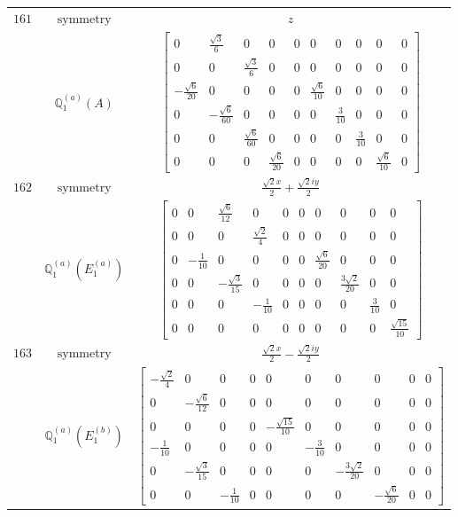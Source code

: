 \documentclass[fleqn,8pt,landscape]{jsarticle}
\begin{document}
\begin{longtable}{ccc}
$ 161 $ & $ \text{symmetry} $ & $ z $ \\
$  $ & $ \mathbb{Q}_{1}^{(a)}(A) $ & $ \begin{bmatrix} 0 & \frac{\sqrt{3}}{6} & 0 & 0 & 0 & 0 & 0 & 0 & 0 & 0 \\ 0 & 0 & \frac{\sqrt{3}}{6} & 0 & 0 & 0 & 0 & 0 & 0 & 0 \\ - \frac{\sqrt{6}}{20} & 0 & 0 & 0 & 0 & \frac{\sqrt{6}}{10} & 0 & 0 & 0 & 0 \\ 0 & - \frac{\sqrt{6}}{60} & 0 & 0 & 0 & 0 & \frac{3}{10} & 0 & 0 & 0 \\ 0 & 0 & \frac{\sqrt{6}}{60} & 0 & 0 & 0 & 0 & \frac{3}{10} & 0 & 0 \\ 0 & 0 & 0 & \frac{\sqrt{6}}{20} & 0 & 0 & 0 & 0 & \frac{\sqrt{6}}{10} & 0 \end{bmatrix} $ \\ \hline
$ 162 $ & $ \text{symmetry} $ & $ \frac{\sqrt{2} x}{2} + \frac{\sqrt{2} i y}{2} $ \\
$  $ & $ \mathbb{Q}_{1}^{(a)}(E_{1}^{(a)}) $ & $ \begin{bmatrix} 0 & 0 & \frac{\sqrt{6}}{12} & 0 & 0 & 0 & 0 & 0 & 0 & 0 \\ 0 & 0 & 0 & \frac{\sqrt{2}}{4} & 0 & 0 & 0 & 0 & 0 & 0 \\ 0 & - \frac{1}{10} & 0 & 0 & 0 & 0 & \frac{\sqrt{6}}{20} & 0 & 0 & 0 \\ 0 & 0 & - \frac{\sqrt{3}}{15} & 0 & 0 & 0 & 0 & \frac{3 \sqrt{2}}{20} & 0 & 0 \\ 0 & 0 & 0 & - \frac{1}{10} & 0 & 0 & 0 & 0 & \frac{3}{10} & 0 \\ 0 & 0 & 0 & 0 & 0 & 0 & 0 & 0 & 0 & \frac{\sqrt{15}}{10} \end{bmatrix} $ \\ \hline
$ 163 $ & $ \text{symmetry} $ & $ \frac{\sqrt{2} x}{2} - \frac{\sqrt{2} i y}{2} $ \\
$  $ & $ \mathbb{Q}_{1}^{(a)}(E_{1}^{(b)}) $ & $ \begin{bmatrix} - \frac{\sqrt{2}}{4} & 0 & 0 & 0 & 0 & 0 & 0 & 0 & 0 & 0 \\ 0 & - \frac{\sqrt{6}}{12} & 0 & 0 & 0 & 0 & 0 & 0 & 0 & 0 \\ 0 & 0 & 0 & 0 & - \frac{\sqrt{15}}{10} & 0 & 0 & 0 & 0 & 0 \\ - \frac{1}{10} & 0 & 0 & 0 & 0 & - \frac{3}{10} & 0 & 0 & 0 & 0 \\ 0 & - \frac{\sqrt{3}}{15} & 0 & 0 & 0 & 0 & - \frac{3 \sqrt{2}}{20} & 0 & 0 & 0 \\ 0 & 0 & - \frac{1}{10} & 0 & 0 & 0 & 0 & - \frac{\sqrt{6}}{20} & 0 & 0 \end{bmatrix} $ \\ \hline

\end{longtable}
\end{document}
